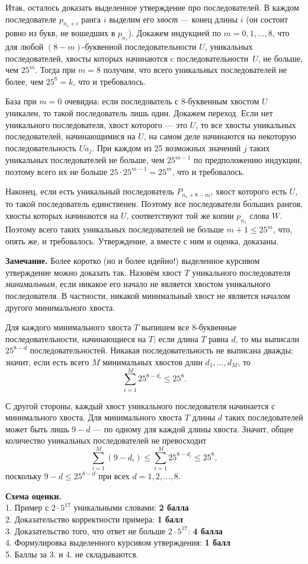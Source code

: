 \documentclass[12pt]{article}
\def \marking{\par \bigskip \textbf{Схема оценки. }}
\def\leq{\leqslant}
\begin{document}
\smallskip
Итак, осталось доказать выделенное утверждение про последователей. В каждом последователе $p_{n_s+i}$ ранга $i$ выделим его \emph{хвост} %
--- конец длины $i$ (он состоит ровно из букв, не вошедших в $p_{n_s}$). Докажем индукцией по $m=0,1,\dots,8$, что для любой $(8-m)$-буквенной последовательности $U$, уникальных последователей, хвосты которых начинаются c последовательности~$U$, не больше, чем $25^m$. Тогда при $m=8$ получим, что всего уникальных последователей не более, чем $25^8=k$, что и требовалось.

База при $m=0$ очевидна: если последователь с 8-буквенным хвостом $U$ уникален, то такой последователь лишь один. Докажем переход. Если нет уникального последователя, хвост которого --- это $U$, то все хвосты уникальных последователей,  начинающимися на $U$, на самом деле начинаются на некоторую последовательность $Ua_j$. При каждом из 25 возможных значений $j$ таких уникальных последователей не больше, чем $25^{m-1}$ по предположению индукции, поэтому всего их не больше $25\cdot 25^{m-1}=25^m$, что и требовалось.

Наконец, если есть уникальный последователь $P_{n_s+8-m}$, хвост которого есть $U$, то такой последователь единственен. Поэтому все последователи б\'{о}льших рангов, хвосты которых начинаются на $U$, соответствуют той же копии $p_{n_s}$ слова $W$. Поэтому всего таких уникальных последователей не больше $m+1\leq 25^m$, что, опять же, и требовалось. Утверждение, а вместе с ним и оценка, доказаны.

\medskip
\textbf{Замечание.} Более коротко (но и более идейно!) выделенное курсивом утверждение можно доказать так. Назовём хвост $T$ уникального последователя \emph{минимальным}, если никакое его начало не является хвостом уникального последователя. В частности, никакой минимальный хвост не является началом другого минимального хвоста.

Для каждого минимального хвоста $T$ выпишем все 8-буквенные последовательности, начинающиеся на $T$; если длина $T$ равна $d$, то мы выписали $25^{8-d}$ последовательностей. Никакая последовательность не выписана дважды; значит, если есть всего $M$ минимальных хвостов длин $d_1,\dots,d_M$, то
$$
  \sum_{i=1}^M 25^{8-d_i}\leq 25^8.
$$

С другой стороны, каждый хвост уникального последователя начинается с минимального хвоста. Для минимального хвоста $T$ длины $d$ таких последователей может быть лишь $9-d$ --- по одному для каждой длины хвоста. Значит, общее количество уникальных последователей не превосходит
$$
  \sum_{i=1}^M (9-d_i)\leq \sum_{i=1}^M 25^{8-d_i}\leq 25^8,
$$
поскольку $9-d\leq 25^{8-d}$ при всех $d=1,2,\dots,8$.

\marking
\\ 1. Пример с $2\cdot 5^{17}$ уникальными словами: \dotfill \textbf{2 балла}
\\ 2. Доказательство корректности примера: \dotfill \textbf{1 балл}
\\ 3. Доказательство того, что ответ не больше $2\cdot 5^{17}$: \dotfill \textbf{4 балла}
\\ 4. Формулировка выделенного курсивом утверждения: \dotfill \textbf{1 балл}
\\ 5. Баллы за 3. и 4. не складываются.
\end{document}
